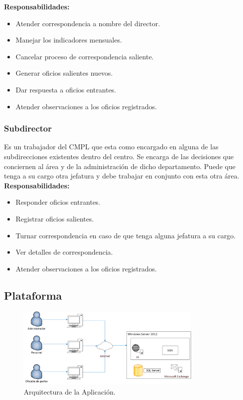 \textbf{Responsabilidades:}
\begin{itemize}
	\item Atender correspondencia a nombre del director.
	\item Manejar los indicadores mensuales.
	\item Cancelar proceso de correspondencia saliente.
	\item Generar oficios salientes nuevos.
	\item Dar respuesta a oficios entrantes.
	\item Atender observaciones a los oficios registrados.
\end{itemize}

\subsubsection{Subdirector}
Es un trabajador del CMPL que esta como encargado en alguna de las subdirecciones existentes dentro del centro. Se encarga de las decisiones que conciernen al área y de la administración de dicho departamento. Puede que tenga a su cargo otra jefatura y debe trabajar en conjunto con esta otra área.\\ 

\textbf{Responsabilidades:}
\begin{itemize}
	\item Responder oficios entrantes.
	\item Registrar oficios salientes.
	\item Turnar correspondencia en caso de que tenga alguna jefatura a su cargo.
	\item Ver detalles de correspondencia.
	\item Atender observaciones a los oficios registrados.
\end{itemize}

\subsection{Plataforma}

	\begin{figure}[htbp!]
		\centering
			\includegraphics[width=0.8\textwidth]{images/propuesta/arquitectura}
		\caption{Arquitectura de la Aplicación.}
	\end{figure}
	

